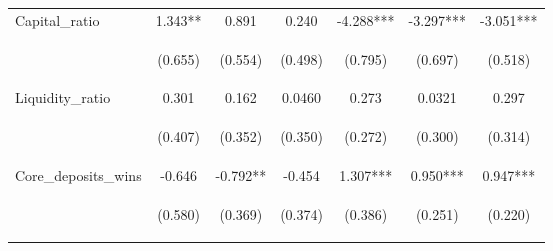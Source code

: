 \documentclass[]{article}
\begin{document}
\begin{center}
\begin{tabular}{lcccccc}
Capital\_ratio & 1.343** & 0.891 & 0.240 & -4.288*** & -3.297*** & -3.051*** \\
\vspace{4pt} & \begin{footnotesize}(0.655)\end{footnotesize} & \begin{footnotesize}(0.554)\end{footnotesize} & \begin{footnotesize}(0.498)\end{footnotesize} & \begin{footnotesize}(0.795)\end{footnotesize} & \begin{footnotesize}(0.697)\end{footnotesize} & \begin{footnotesize}(0.518)\end{footnotesize} \\
Liquidity\_ratio & 0.301 & 0.162 & 0.0460 & 0.273 & 0.0321 & 0.297 \\
\vspace{4pt} & \begin{footnotesize}(0.407)\end{footnotesize} & \begin{footnotesize}(0.352)\end{footnotesize} & \begin{footnotesize}(0.350)\end{footnotesize} & \begin{footnotesize}(0.272)\end{footnotesize} & \begin{footnotesize}(0.300)\end{footnotesize} & \begin{footnotesize}(0.314)\end{footnotesize} \\
Core\_deposits\_wins & -0.646 & -0.792** & -0.454 & 1.307*** & 0.950*** & 0.947*** \\
\vspace{4pt} & \begin{footnotesize}(0.580)\end{footnotesize} & \begin{footnotesize}(0.369)\end{footnotesize} & \begin{footnotesize}(0.374)\end{footnotesize} & \begin{footnotesize}(0.386)\end{footnotesize} & \begin{footnotesize}(0.251)\end{footnotesize} & \begin{footnotesize}(0.220)\end{footnotesize} \\

\end{tabular}
\end{center}
\end{document}
